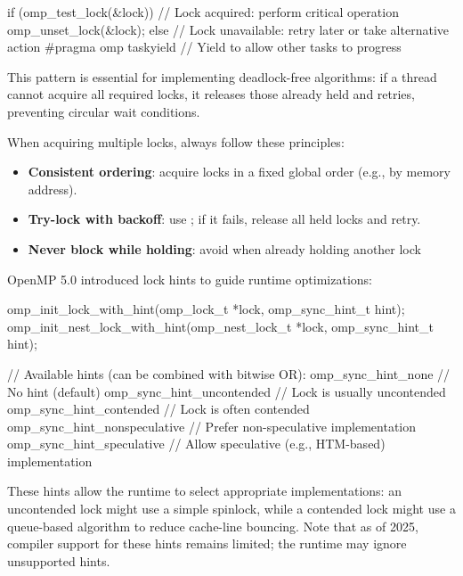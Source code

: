 \begin{codeblock}[language=C]
if (omp_test_lock(&lock)) {
    // Lock acquired: perform critical operation
    omp_unset_lock(&lock);
} else {
    // Lock unavailable: retry later or take alternative action
    #pragma omp taskyield  // Yield to allow other tasks to progress
}
\end{codeblock}

This pattern is essential for implementing deadlock-free algorithms: if a thread cannot acquire all required locks, it releases those already held and retries, preventing circular wait conditions.

When acquiring multiple locks, always follow these principles:
\begin{itemize}[noitemsep]
    \item \textbf{Consistent ordering}: acquire locks in a fixed global order (e.g., by memory address).
    \item \textbf{Try-lock with backoff}: use ; if it fails, release all held locks and retry.
    \item \textbf{Never block while holding}: avoid  when already holding another lock
\end{itemize}

\begin{advancedblock}
OpenMP 5.0 introduced lock hints to guide runtime optimizations:

\begin{codeblock}[language=C, basicstyle=\ttfamily\scriptsize]
omp_init_lock_with_hint(omp_lock_t *lock, omp_sync_hint_t hint);
omp_init_nest_lock_with_hint(omp_nest_lock_t *lock, omp_sync_hint_t hint);

// Available hints (can be combined with bitwise OR):
omp_sync_hint_none           // No hint (default)
omp_sync_hint_uncontended    // Lock is usually uncontended
omp_sync_hint_contended      // Lock is often contended
omp_sync_hint_nonspeculative // Prefer non-speculative implementation
omp_sync_hint_speculative    // Allow speculative (e.g., HTM-based) implementation
\end{codeblock}

These hints allow the runtime to select appropriate implementations: an uncontended lock might use a simple spinlock, while a contended lock might use a queue-based algorithm to reduce cache-line bouncing. Note that as of 2025, compiler support for these hints remains limited; the runtime may ignore unsupported hints.
\end{advancedblock}

